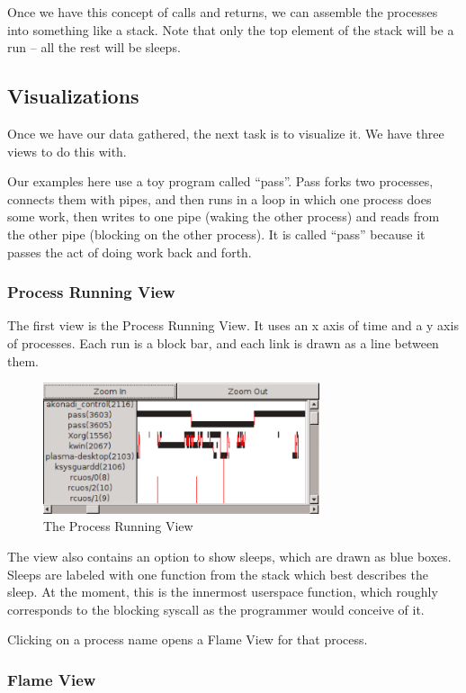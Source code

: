 \documentclass[10pt]{article}
\begin{document}
Once we have this concept of calls and returns, we can assemble the processes into something like a stack.  Note that only the top element of the stack will be a run -- all the rest will be sleeps.

\subsection{Visualizations}

Once we have our data gathered, the next task is to visualize it.  We have three views to do this with.

Our examples here use a toy program called ``pass''.  Pass forks two processes, connects them with pipes, and then runs in a loop in which one process does some work, then writes to one pipe (waking the other process) and reads from the other pipe (blocking on the other process).  It is called ``pass'' because it passes the act of doing work back and forth.

\subsubsection{Process Running View}

The first view is the Process Running View.  It uses an x axis of time and a y axis of processes.  Each run is a block bar, and each link is drawn as a line between them.

\begin{figure}[h!]
\includegraphics[width=3.2in]{images/screenshot}
\caption{The Process Running View}
\end{figure}

The view also contains an option to show sleeps, which are drawn as blue boxes.  Sleeps are labeled with one function from the stack which best describes the sleep.  At the moment, this is the innermost userspace function, which roughly corresponds to the blocking syscall as the programmer would conceive of it.

Clicking on a process name opens a Flame View for that process.

\subsubsection{Flame View}
\end{document}
